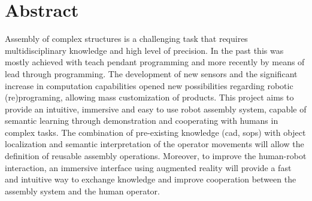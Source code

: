 \chapter*{Abstract}

Assembly of complex structures is a challenging task that requires multidisciplinary knowledge and high level of precision. In the past this was mostly achieved with teach pendant programming and more recently by means of lead through programming. The development of new sensors and the significant increase in computation capabilities opened new possibilities regarding robotic (re)programing, allowing mass customization of products. This project aims to provide an intuitive, immersive and easy to use robot assembly system, capable of semantic learning through demonstration and cooperating with humans in complex tasks. The combination of pre-existing knowledge (\gls{cad}, \glspl{sop}) with object localization and semantic interpretation of the operator movements will allow the definition of reusable assembly operations. Moreover, to improve the human-robot interaction, an immersive interface using augmented reality will provide a fast and intuitive way to exchange knowledge and improve cooperation between the assembly system and the human operator.

